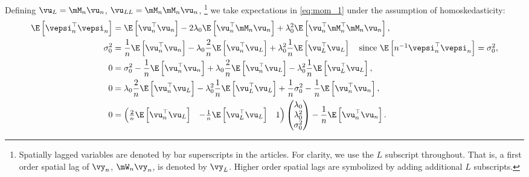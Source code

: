 \documentclass[english,12pt]{book}\usepackage[]{graphicx}\usepackage[]{xcolor}
\begin{document}
Defining $\vu_{L} = \mM_n\vu_n$, $\vu_{LL} = \mM_n\mM_n\vu_n$, \footnote{Spatially lagged variables are denoted by bar superscripts in the articles. For clarity, we use the $L$ subscript throughout. That is, a first order spatial lag of $\vy_n$, $\mW_n\vy_n$, is denoted by $\vy_L$. Higher order spatial lags are symbolized by adding additional $L$ subscripts.} we take expectations in \eqref{eq:mom_1} under the assumption of homoskedasticity:
\begin{equation}\label{eq:Pequation_1_gmm}
  \begin{aligned}
      \E\left[\vepsi^\top_n \vepsi_n\right] & = \E\left[\vu^\top_n\vu_n\right] - 2\lambda_0\E\left[\vu^\top_n\mM_n\vu_n\right] + \lambda^2_0\E\left[\vu^\top_n\mM^\top_n\mM_n\vu_n\right], \\
       \sigma^2_0& = \frac{1}{n}\E\left[\vu^\top_n\vu_n\right] - \lambda_0 \frac{2}{n}\E\left[\vu^\top_n\vu_L\right] + \lambda^2_0\frac{1}{n}\E\left[\vu_L^\top\vu_L\right] \quad \mbox{since $\E\left[n^{-1}\vepsi^\top_n \vepsi_n\right] = \sigma^2_0$},\\
       0 &= \sigma^2_0  - \frac{1}{n}\E\left[\vu^\top_n\vu_n\right] + \lambda_0 \frac{2}{n}\E\left[\vu^\top_n\vu_L\right] - \lambda^2_0\frac{1}{n}\E\left[\vu_L^\top\vu_L\right],\\
       0 &= \lambda_0 \frac{2}{n}\E\left[\vu^\top_n\vu_L\right] - \lambda^2_0\frac{1}{n}\E\left[\vu_L^\top\vu_L\right] + \frac{1}{n}\sigma^2_0 - \frac{1}{n}\E\left[\vu^\top_n\vu_n\right], \\
       0 & =  \begin{pmatrix}
         \frac{2}{n}\E\left[\vu^\top_n\vu_L\right] & - \frac{1}{n}\E\left[\vu_L^\top\vu_L\right] &  1
            \end{pmatrix}
            \begin{pmatrix}
              \lambda_0 \\
              \lambda^2_0 \\
              \sigma^2_0
            \end{pmatrix} - \frac{1}{n}\E\left[\vu^\top_n\vu_n\right].
  \end{aligned}
\end{equation}
\end{document}
